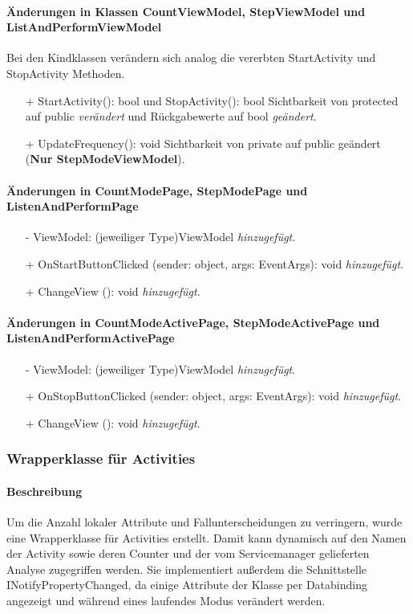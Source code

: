 \documentclass[a4paper,12pt]{article}
\begin{document}
\paragraph{Änderungen in Klassen CountViewModel, StepViewModel und ListAndPerformViewModel}
Bei den Kindklassen verändern sich analog die vererbten StartActivity und StopActivity Methoden.
\begin{itemize}
	\item[+] StartActivity(): bool und StopActivity(): bool Sichtbarkeit von protected auf public \textit{verändert} und Rückgabewerte auf bool \textit{geändert}.
	\item[+] UpdateFrequency(): void Sichtbarkeit von private auf public geändert (\textbf{Nur StepModeViewModel}). 
\end{itemize}
\paragraph{Änderungen in CountModePage, StepModePage und ListenAndPerformPage}
\begin{itemize}
	\item[-] ViewModel: (jeweiliger Type)ViewModel \textit{hinzugefügt}.
	\item[+] OnStartButtonClicked (sender: object, args: EventArgs): void \textit{hinzugefügt}.
	\item[+] ChangeView (): void \textit{hinzugefügt}.
\end{itemize}
\paragraph{Änderungen in CountModeActivePage, StepModeActivePage und ListenAndPerformActivePage}
\begin{itemize}
	\item[-] ViewModel: (jeweiliger Type)ViewModel \textit{hinzugefügt}.
	\item[+] OnStopButtonClicked (sender: object, args: EventArgs): void \textit{hinzugefügt}.
	\item[+] ChangeView (): void \textit{hinzugefügt}.
\end{itemize}

\subsubsection{Wrapperklasse für Activities}
\paragraph{Beschreibung}
Um die Anzahl lokaler Attribute und Fallunterscheidungen zu verringern, wurde eine Wrapperklasse für Activities  erstellt. Damit kann dynamisch auf den Namen der Activity sowie deren Counter und der vom Servicemanager gelieferten Analyse zugegriffen werden. Sie implementiert außerdem die Schnittstelle INotifyPropertyChanged, da einige Attribute der Klasse per Databinding angezeigt und während eines laufendes Modus verändert werden.
\end{document}
